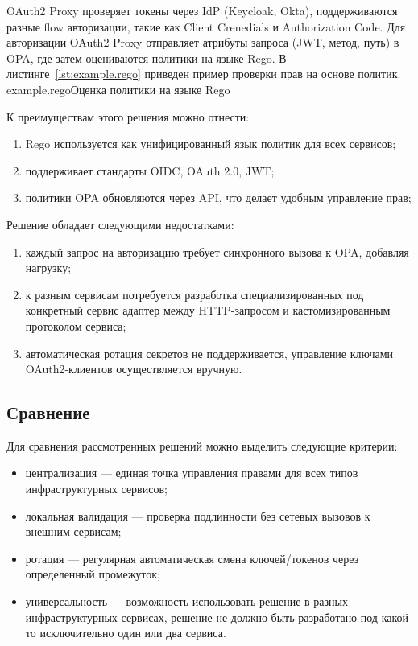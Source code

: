 OAuth2 Proxy проверяет токены через IdP (Keycloak, Okta), поддерживаются разные flow авторизации, такие как Client Crenedials и Authorization Code. Для авторизации OAuth2 Proxy отправляет атрибуты запроса (JWT, метод, путь) в OPA, где затем оцениваются политики на языке Rego. В листинге~\ref{lst:example.rego} приведен пример проверки прав на основе политик. 
\pagebreak
{}
	{example.rego}{Оценка политики на языке Rego}

К преимуществам этого решения можно отнести:
\begin{enumerate}
	\item Rego используется как унифицированный язык политик для всех сервисов;
	\item поддерживает стандарты OIDC, OAuth 2.0, JWT;
	\item политики OPA обновляются через API, что делает удобным управление прав;
\end{enumerate}

Решение обладает следующими недостатками:
\begin{enumerate}
	\item каждый запрос на авторизацию требует синхронного вызова к OPA, добавляя нагрузку;
	\item к разным сервисам потребуется разработка специализированных под конкретный сервис адаптер между HTTP-запросом и кастомизированным протоколом сервиса;
	\item автоматическая ротация секретов не поддерживается, управление ключами OAuth2-клиентов осуществляется вручную.
\end{enumerate} 

\subsection{Сравнение}

Для сравнения рассмотренных решений можно выделить следующие критерии:
\begin{itemize}
	\item централизация --- единая точка управления правами для всех типов инфраструктурных сервисов;
	\item локальная валидация --- проверка подлинности без сетевых вызовов к внешним сервисам;
	\item ротация --- регулярная автоматическая смена ключей/токенов через определенный промежуток;
	\item универсальность --- возможность использовать решение в разных инфраструктурных сервисах, решение не должно быть разработано под какой-то исключительно один или два сервиса.
\end{itemize}

